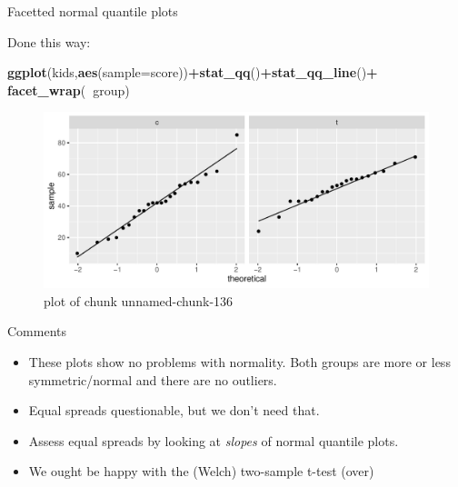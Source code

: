 \documentclass[ignorenonframetext,]{beamer}
\newenvironment{Shaded}{\begin{snugshade}}{\end{snugshade}}
\newcommand{\DataTypeTok}[1]{\textcolor[rgb]{0.13,0.29,0.53}{#1}}
\newcommand{\KeywordTok}[1]{\textcolor[rgb]{0.13,0.29,0.53}{\textbf{#1}}}
\newcommand{\NormalTok}[1]{#1}
\newcommand{\OperatorTok}[1]{\textcolor[rgb]{0.81,0.36,0.00}{\textbf{#1}}}
\providecommand{\tightlist}{%
  \setlength{\itemsep}{0pt}\setlength{\parskip}{0pt}}
\begin{document}
\begin{frame}[fragile]{Facetted normal quantile plots}
\protect\hypertarget{facetted-normal-quantile-plots}{}

Done this way:

\begin{Shaded}
\begin{Highlighting}[]
\KeywordTok{ggplot}\NormalTok{(kids,}\KeywordTok{aes}\NormalTok{(}\DataTypeTok{sample=}\NormalTok{score))}\OperatorTok{+}\KeywordTok{stat_qq}\NormalTok{()}\OperatorTok{+}\KeywordTok{stat_qq_line}\NormalTok{()}\OperatorTok{+}
\KeywordTok{facet_wrap}\NormalTok{(}\OperatorTok{~}\NormalTok{group)}
\end{Highlighting}
\end{Shaded}

\begin{figure}
\centering
\includegraphics{figure/unnamed-chunk-136-1.pdf}
\caption{plot of chunk unnamed-chunk-136}
\end{figure}

\end{frame}

\begin{frame}{Comments}
\protect\hypertarget{comments-8}{}

\begin{itemize}
\tightlist
\item
  These plots show no problems with normality. Both groups are more or
  less symmetric/normal and there are no outliers.
\item
  Equal spreads questionable, but we don't need that.
\item
  Assess equal spreads by looking at \emph{slopes} of normal quantile
  plots.
\item
  We ought be happy with the (Welch) two-sample t-test (over)
\end{itemize}

\end{frame}
\end{document}
